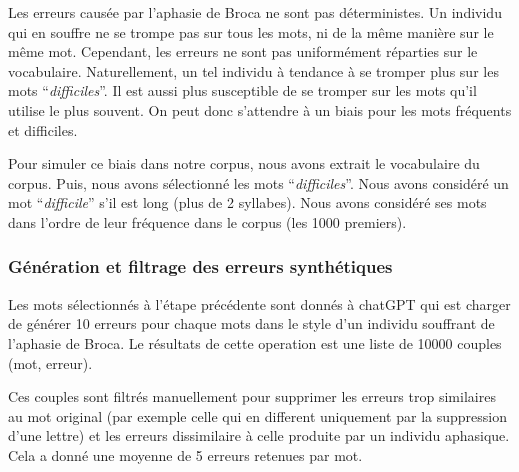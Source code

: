 Les erreurs causée par l'aphasie de Broca ne sont pas déterministes.
Un individu qui en souffre ne se trompe pas sur tous les mots, ni de la même manière sur le même mot.
Cependant, les erreurs ne sont pas uniformément réparties sur le vocabulaire.
Naturellement, un tel individu à tendance à se tromper plus sur les mots ``\emph{difficiles}''.
Il est aussi plus susceptible de se tromper sur les mots qu'il utilise le plus souvent.
On peut donc s'attendre à un biais pour les mots fréquents et difficiles.

Pour simuler ce biais dans notre corpus, nous avons extrait le vocabulaire du corpus.
Puis, nous avons sélectionné les mots ``\emph{difficiles}''. 
Nous avons considéré un mot ``\emph{difficile}'' s'il est long (plus de 2 syllabes).
Nous avons considéré ses mots dans l'ordre de leur fréquence dans le corpus (les 1000 premiers).

\subsubsection{Génération et filtrage des erreurs synthétiques}

Les mots sélectionnés à l'étape précédente sont donnés à chatGPT 
qui est charger de générer 10 erreurs pour chaque mots dans le style d'un individu souffrant de l'aphasie de Broca.
Le résultats de cette operation est une liste de 10000 couples (mot, erreur).

Ces couples sont filtrés manuellement pour supprimer les erreurs trop similaires au mot original 
(par exemple celle qui en different uniquement par la suppression d'une lettre)
et les erreurs dissimilaire à celle produite par un individu aphasique.
Cela a donné une moyenne de 5 erreurs retenues par mot.

